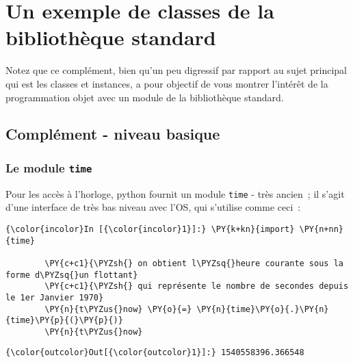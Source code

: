     
    
    
    

    

    \hypertarget{un-exemple-de-classes-de-la-bibliothuxe8que-standard}{%
\section{Un exemple de classes de la bibliothèque
standard}\label{un-exemple-de-classes-de-la-bibliothuxe8que-standard}}

    Notez que ce complément, bien qu'un peu digressif par rapport au sujet
principal qui est les classes et instances, a pour objectif de vous
montrer l'intérêt de la programmation objet avec un module de la
bibliothèque standard.

    \hypertarget{compluxe9ment---niveau-basique}{%
\subsection{Complément - niveau
basique}\label{compluxe9ment---niveau-basique}}

    \hypertarget{le-module-time}{%
\subsubsection{\texorpdfstring{Le module
\texttt{time}}{Le module time}}\label{le-module-time}}

    Pour les accès à l'horloge, python fournit un module \texttt{time} -
très ancien~; il s'agit d'une interface de très bas niveau avec l'OS,
qui s'utilise comme ceci~:

    \begin{Verbatim}[commandchars=\\\{\}]
{\color{incolor}In [{\color{incolor}1}]:} \PY{k+kn}{import} \PY{n+nn}{time}
        
        \PY{c+c1}{\PYZsh{} on obtient l\PYZsq{}heure courante sous la forme d\PYZsq{}un flottant}
        \PY{c+c1}{\PYZsh{} qui représente le nombre de secondes depuis le 1er Janvier 1970}
        \PY{n}{t\PYZus{}now} \PY{o}{=} \PY{n}{time}\PY{o}{.}\PY{n}{time}\PY{p}{(}\PY{p}{)}
        \PY{n}{t\PYZus{}now}
\end{Verbatim}


\begin{Verbatim}[commandchars=\\\{\}]
{\color{outcolor}Out[{\color{outcolor}1}]:} 1540558396.366548
\end{Verbatim}
            
